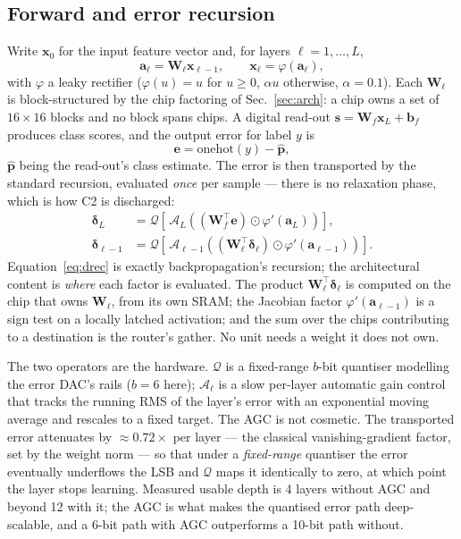 \documentclass[11pt]{article}
\newcommand{\W}{\bm W}
\newcommand{\x}{\bm x}
\newcommand{\bdelta}{\bm\delta}
\begin{document}
\subsection{Forward and error recursion}

Write $\x_0$ for the input feature vector and, for layers $\ell = 1,\dots,L$,
\begin{equation}
\bm a_\ell = \W_\ell \x_{\ell-1}, \qquad \x_\ell = \varphi(\bm a_\ell),
\end{equation}
with $\varphi$ a leaky rectifier ($\varphi(u) = u$ for $u \ge 0$, $\alpha u$ otherwise,
$\alpha = 0.1$). Each $\W_\ell$ is block-structured by the chip factoring of
Sec.~\ref{sec:arch}: a chip owns a set of $16\times16$ blocks and no block spans chips. A digital
read-out $\bm s = \W_f \x_L + \bm b_f$ produces class scores, and the output error for label $y$ is
\begin{equation}
\bm e = \mathrm{onehot}(y) - \hat{\bm p},
\end{equation}
$\hat{\bm p}$ being the read-out's class estimate. The error is then transported by the standard
recursion, evaluated \emph{once} per sample --- there is no relaxation phase, which is how C2 is
discharged:
\begin{align}
\bdelta_L &= \mathcal{Q}\!\left[\,\mathcal{A}_L\!\left((\W_f^{\!\top}\bm e)\odot\varphi'(\bm a_L)\right)\right],\label{eq:dL}\\
\bdelta_{\ell-1} &= \mathcal{Q}\!\left[\,\mathcal{A}_{\ell-1}\!\left((\W_\ell^{\!\top}\bdelta_\ell)\odot\varphi'(\bm a_{\ell-1})\right)\right].\label{eq:drec}
\end{align}
Equation~\eqref{eq:drec} is exactly backpropagation's recursion; the architectural content is
\emph{where} each factor is evaluated. The product $\W_\ell^{\!\top}\bdelta_\ell$ is computed on the
chip that owns $\W_\ell$, from its own SRAM; the Jacobian factor $\varphi'(\bm a_{\ell-1})$ is a sign
test on a locally latched activation; and the sum over the chips contributing to a destination is the
router's gather. No unit needs a weight it does not own.

The two operators are the hardware. $\mathcal{Q}$ is a fixed-range $b$-bit quantiser modelling the
error DAC's rails ($b = 6$ here); $\mathcal{A}_\ell$ is a slow per-layer automatic gain control that
tracks the running RMS of the layer's error with an exponential moving average and rescales to a
fixed target. The AGC is not cosmetic. The transported error attenuates by $\approx 0.72\times$ per
layer --- the classical vanishing-gradient factor, set by the weight norm --- so that under a
\emph{fixed-range} quantiser the error eventually underflows the LSB and $\mathcal{Q}$ maps it
identically to zero, at which point the layer stops learning. Measured usable depth is 4 layers
without AGC and beyond 12 with it; the AGC is what makes the quantised error path deep-scalable, and a
6-bit path with AGC outperforms a 10-bit path without.
\end{document}
